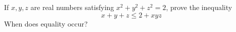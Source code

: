 If $x, y, z$ are real numbers satisfying $x^2 +y^2 +z^2 = 2$, prove the inequality
\[ x + y + z \leq 2 + xyz \]
When does equality occur?